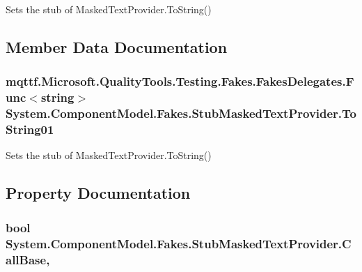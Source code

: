 Sets the stub of Masked\-Text\-Provider.\-To\-String()



\subsection{Member Data Documentation}
\hypertarget{class_system_1_1_component_model_1_1_fakes_1_1_stub_masked_text_provider_afaa646671df1b095ee4723a27d837351}{
\subsubsection[{To\-String01}]{\setlength{\rightskip}{0pt plus 5cm}mqttf.\-Microsoft.\-Quality\-Tools.\-Testing.\-Fakes.\-Fakes\-Delegates.\-Func$<$string$>$ System.\-Component\-Model.\-Fakes.\-Stub\-Masked\-Text\-Provider.\-To\-String01}}\label{class_system_1_1_component_model_1_1_fakes_1_1_stub_masked_text_provider_afaa646671df1b095ee4723a27d837351}


Sets the stub of Masked\-Text\-Provider.\-To\-String()



\subsection{Property Documentation}
\hypertarget{class_system_1_1_component_model_1_1_fakes_1_1_stub_masked_text_provider_a7ee9ff16f4eebea5db113871acd04b1b}{
\subsubsection[{Call\-Base}]{\setlength{\rightskip}{0pt plus 5cm}bool System.\-Component\-Model.\-Fakes.\-Stub\-Masked\-Text\-Provider.\-Call\-Base\hspace{0.3cm}{\ttfamily [get]}, {\ttfamily [set]}}}\label{class_system_1_1_component_model_1_1_fakes_1_1_stub_masked_text_provider_a7ee9ff16f4eebea5db113871acd04b1b}



